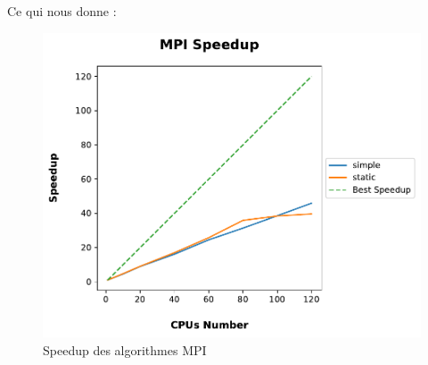 \documentclass[12pt,a4paper,oneside, titlepage]{report}
\begin{document}
		Ce qui nous donne :

		\begin{figure}[H]
			\centering
			\includegraphics[scale=0.80]{graphs/speedupMPI}
			\caption {Speedup des algorithmes MPI}
		\end{figure}
\end{document}
